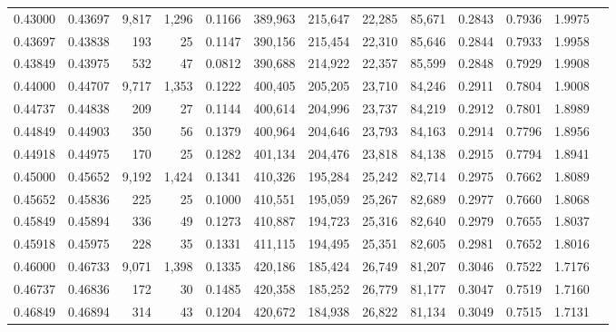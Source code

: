 \begin{tabular}{rrrrrrrrrrrrr}
0.43000 & 0.43697 &  9,817 & 1,296 &                                     0.1166 & 389,963 & 215,647 &  22,285 &  85,671 & 0.2843 & 0.7936 & 1.9975 \\
0.43697 & 0.43838 &    193 &    25 &                                     0.1147 & 390,156 & 215,454 &  22,310 &  85,646 & 0.2844 & 0.7933 & 1.9958 \\
0.43849 & 0.43975 &    532 &    47 &                                     0.0812 & 390,688 & 214,922 &  22,357 &  85,599 & 0.2848 & 0.7929 & 1.9908 \\
0.44000 & 0.44707 &  9,717 & 1,353 &                                     0.1222 & 400,405 & 205,205 &  23,710 &  84,246 & 0.2911 & 0.7804 & 1.9008 \\
0.44737 & 0.44838 &    209 &    27 &                                     0.1144 & 400,614 & 204,996 &  23,737 &  84,219 & 0.2912 & 0.7801 & 1.8989 \\
0.44849 & 0.44903 &    350 &    56 &                                     0.1379 & 400,964 & 204,646 &  23,793 &  84,163 & 0.2914 & 0.7796 & 1.8956 \\
0.44918 & 0.44975 &    170 &    25 &                                     0.1282 & 401,134 & 204,476 &  23,818 &  84,138 & 0.2915 & 0.7794 & 1.8941 \\
0.45000 & 0.45652 &  9,192 & 1,424 &                                     0.1341 & 410,326 & 195,284 &  25,242 &  82,714 & 0.2975 & 0.7662 & 1.8089 \\
0.45652 & 0.45836 &    225 &    25 &                                     0.1000 & 410,551 & 195,059 &  25,267 &  82,689 & 0.2977 & 0.7660 & 1.8068 \\
0.45849 & 0.45894 &    336 &    49 &                                     0.1273 & 410,887 & 194,723 &  25,316 &  82,640 & 0.2979 & 0.7655 & 1.8037 \\
0.45918 & 0.45975 &    228 &    35 &                                     0.1331 & 411,115 & 194,495 &  25,351 &  82,605 & 0.2981 & 0.7652 & 1.8016 \\
0.46000 & 0.46733 &  9,071 & 1,398 &                                     0.1335 & 420,186 & 185,424 &  26,749 &  81,207 & 0.3046 & 0.7522 & 1.7176 \\
0.46737 & 0.46836 &    172 &    30 &                                     0.1485 & 420,358 & 185,252 &  26,779 &  81,177 & 0.3047 & 0.7519 & 1.7160 \\
0.46849 & 0.46894 &    314 &    43 &                                     0.1204 & 420,672 & 184,938 &  26,822 &  81,134 & 0.3049 & 0.7515 & 1.7131 \\

\end{tabular}
